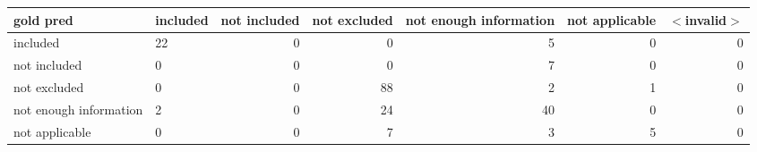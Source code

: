\begin{tabular}{llrrrrr}
\toprule
gold  pred & included & not included & not excluded & not enough information & not applicable & $<$invalid$>$ \\
\midrule
included & 22 & 0 & 0 & 5 & 0 & 0 \\
not included & 0 & 0 & 0 & 7 & 0 & 0 \\
not excluded & 0 & 0 & 88 & 2 & 1 & 0 \\
not enough information & 2 & 0 & 24 & 40 & 0 & 0 \\
not applicable & 0 & 0 & 7 & 3 & 5 & 0 \\
\bottomrule
\end{tabular}
